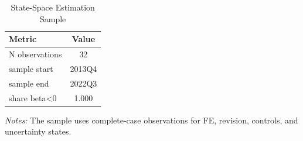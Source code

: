 \begin{table}[!htbp]
\centering
\begin{threeparttable}
 \caption{State-Space Estimation Sample}
 \label{tab:ssm_sample}
\begin{tabular}{lc}
\toprule
Metric & Value \\
\midrule
N observations & 32 \\
sample start & 2013Q4 \\
sample end & 2022Q3 \\
share beta<0 & 1.000 \\
\bottomrule
\end{tabular}
\begin{tablenotes}[flushleft]
\footnotesize
\item \textit{Notes:} The sample uses complete-case observations for FE, revision, controls, and uncertainty states.
\end{tablenotes}
\end{threeparttable}
\end{table}
